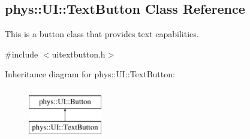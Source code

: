 \hypertarget{classphys_1_1UI_1_1TextButton}{
\subsection{phys::UI::TextButton Class Reference}
\label{classphys_1_1UI_1_1TextButton}
}


This is a button class that provides text capabilities.  




{\ttfamily \#include $<$uitextbutton.h$>$}

Inheritance diagram for phys::UI::TextButton:\begin{figure}[H]
\begin{center}
\leavevmode
\includegraphics[height=2.000000cm]{classphys_1_1UI_1_1TextButton}
\end{center}
\end{figure}
